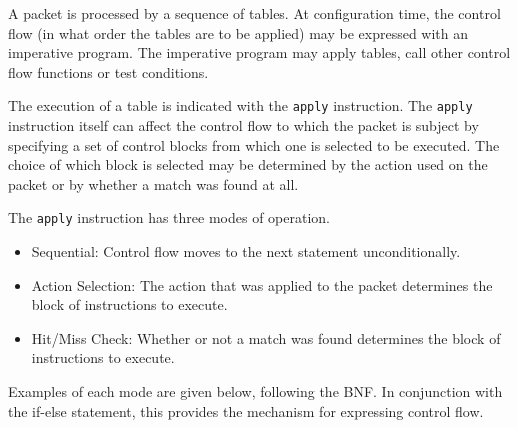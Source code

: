 \documentclass[12pt]{article}
\begin{document}

A packet is processed by a sequence of \matchaction tables.  At configuration
time, the control flow (in what order the tables are to be applied) may be
expressed with an imperative program. The imperative program may apply tables,
call other control flow functions or test conditions.

The execution of a table is indicated with the \texttt{apply} instruction. The \texttt{apply} instruction
itself can affect the control flow to which the packet is subject by specifying
a set of control blocks from which one is selected to be executed. The choice
of which block is selected may be determined by the action used on the packet
or by whether a match was found at all.

The \texttt{apply} instruction has three modes of operation.

\begin{itemize}
\item
Sequential: Control flow moves to the next statement unconditionally.
\item
Action Selection: The action that was applied to the packet determines the
block of instructions to execute.
\item
Hit/Miss Check: Whether or not a match was found determines the block of instructions
to execute.
\end{itemize}


Examples of each mode are given below, following the BNF. In conjunction with
the if-else statement, this provides the mechanism for expressing control
flow.
\end{document}
